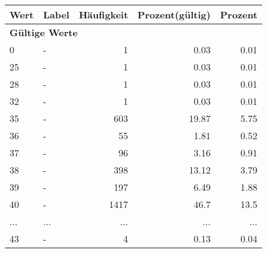      \begin{longtable}{lXrrr}
     \toprule
     \textbf{Wert} & \textbf{Label} & \textbf{Häufigkeit} & \textbf{Prozent(gültig)} & \textbf{Prozent} \\
     \endhead
     \midrule
     \multicolumn{5}{l}{\textbf{Gültige Werte}}\\
        0 & \multicolumn{1}{X}{-} & %
          \num{1} &
          \num[round-mode=places,round-precision=2]{0.03} &
          \num[round-mode=places,round-precision=2]{0.01} \\
        25 & \multicolumn{1}{X}{-} & %
          \num{1} &
          \num[round-mode=places,round-precision=2]{0.03} &
          \num[round-mode=places,round-precision=2]{0.01} \\
        28 & \multicolumn{1}{X}{-} & %
          \num{1} &
          \num[round-mode=places,round-precision=2]{0.03} &
          \num[round-mode=places,round-precision=2]{0.01} \\
        32 & \multicolumn{1}{X}{-} & %
          \num{1} &
          \num[round-mode=places,round-precision=2]{0.03} &
          \num[round-mode=places,round-precision=2]{0.01} \\
        35 & \multicolumn{1}{X}{-} & %
          \num{603} &
          \num[round-mode=places,round-precision=2]{19.87} &
          \num[round-mode=places,round-precision=2]{5.75} \\
        36 & \multicolumn{1}{X}{-} & %
          \num{55} &
          \num[round-mode=places,round-precision=2]{1.81} &
          \num[round-mode=places,round-precision=2]{0.52} \\
        37 & \multicolumn{1}{X}{-} & %
          \num{96} &
          \num[round-mode=places,round-precision=2]{3.16} &
          \num[round-mode=places,round-precision=2]{0.91} \\
        38 & \multicolumn{1}{X}{-} & %
          \num{398} &
          \num[round-mode=places,round-precision=2]{13.12} &
          \num[round-mode=places,round-precision=2]{3.79} \\
        39 & \multicolumn{1}{X}{-} & %
          \num{197} &
          \num[round-mode=places,round-precision=2]{6.49} &
          \num[round-mode=places,round-precision=2]{1.88} \\
        40 & \multicolumn{1}{X}{-} & %
          \num{1417} &
          \num[round-mode=places,round-precision=2]{46.7} &
          \num[round-mode=places,round-precision=2]{13.5} \\
       ... & ... & ... & ... & ... \\
        43 & \multicolumn{1}{X}{-} & %
          \num{4} &
          \num[round-mode=places,round-precision=2]{0.13} &
          \num[round-mode=places,round-precision=2]{0.04} \\


\end{longtable}
